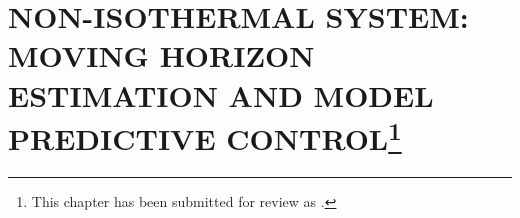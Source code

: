 \chapter[
    Non-isothermal System: Moving Horizon Estimation and Model Predictive Control
]{
    \MakeUppercase{Non-isothermal System: Moving Horizon Estimation and Model Predictive Control}\footnote{
        This chapter has been submitted for review as .
    }}
\label{ch:3}








